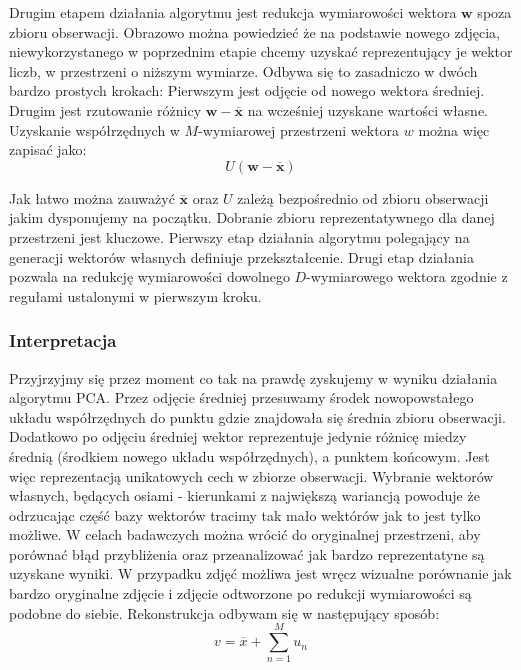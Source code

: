 \documentclass{article}
\newcommand{\bb}{\textbf}
\begin{document}
Drugim etapem działania algorytmu jest redukcja wymiarowości wektora $\bb{w}$ spoza zbioru obserwacji. Obrazowo można powiedzieć że na podstawie nowego zdjęcia, niewykorzystanego w poprzednim etapie chcemy uzyskać reprezentujący je wektor liczb, w przestrzeni o niższym wymiarze. Odbywa się to zasadniczo w dwóch bardzo prostych krokach: Pierwszym jest odjęcie od nowego wektora średniej. Drugim jest rzutowanie różnicy $\bb{w} - \overline{\bb{x}}$ na wcześniej uzyskane wartości własne. Uzyskanie współrzędnych w $M$-wymiarowej przestrzeni wektora $w$ można więc zapisać jako:
\begin{equation}
	U ( \bb{w} - \overline{\bb{x}} ) 
\end{equation}

Jak łatwo można zauważyć $\overline{\bb{x}}$ oraz $U$ zależą bezpośrednio od zbioru obserwacji jakim dysponujemy na początku. Dobranie zbioru reprezentatywnego dla danej przestrzeni jest kluczowe. Pierwszy etap działania algorytmu polegający na generacji wektorów własnych definiuje przekształcenie. Drugi etap działania pozwala na redukcję wymiarowości dowolnego $D$-wymiarowego wektora zgodnie z regułami ustalonymi w pierwszym kroku.

\subsubsection{Interpretacja}
Przyjrzyjmy się przez moment co tak na prawdę zyskujemy w wyniku działania algorytmu PCA. Przez odjęcie średniej przesuwamy środek nowopowstałego układu współrzędnych do punktu gdzie znajdowała się średnia zbioru obserwacji. Dodatkowo po odjęciu średniej wektor reprezentuje jedynie różnicę miedzy średnią (środkiem nowego układu współrzędnych), a punktem końcowym. Jest więc reprezentacją unikatowych cech w zbiorze obserwacji. Wybranie wektorów własnych, będących osiami - kierunkami z największą wariancją powoduje że odrzucając część bazy wektorów tracimy tak mało wektórów jak to jest tylko możliwe. W celach badawczych można wrócić do oryginalnej przestrzeni, aby porównać błąd przybliżenia oraz przeanalizować jak bardzo reprezentatyne są uzyskane wyniki. W przypadku zdjęć możliwa jest wręcz wizualne porównanie jak bardzo oryginalne zdjęcie i zdjęcie odtworzone po redukcji wymiarowości są podobne do siebie. Rekonstrukcja odbywam się w następujący sposób:
\begin{equation}
	v = \overline{x} + \sum_{n=1}^{M}u_n
\end{equation}
\end{document}
